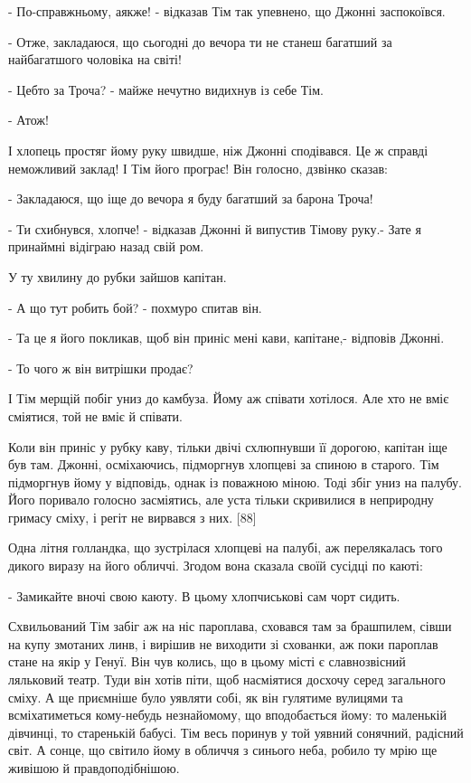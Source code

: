 - По-справжньому, аякже! - відказав Тім так упевнено, що Джонні заспокоївся.

- Отже, закладаюся, що сьогодні до вечора ти не станеш багатший за найбагатшого чоловіка на світі!

- Цебто за Троча? - майже нечутно видихнув із себе Тім.

- Атож!

І хлопець простяг йому руку швидше, ніж Джонні сподівався. Це ж справді неможливий заклад! І Тім його програє! Він голосно, дзвінко сказав:

- Закладаюся, що іще до вечора я буду багатший за барона Троча!

- Ти схибнувся, хлопче! - відказав Джонні й випустив Тімову руку.- Зате я принаймні відіграю назад свій ром.

У ту хвилину до рубки зайшов капітан.

- А що тут робить бой? - похмуро спитав він.

- Та це я його покликав, щоб він приніс мені кави, капітане,- відповів Джонні.

- То чого ж він витрішки продає?

І Тім мерщій побіг униз до камбуза. Йому аж співати хотілося. Але хто не вміє сміятися, той не вміє й співати.

Коли він приніс у рубку каву, тільки двічі схлюпнувши її дорогою, капітан іще був там. Джонні, осміхаючись, підморгнув хлопцеві за спиною в старого. Тім підморгнув йому у відповідь, однак із поважною міною. Тоді збіг униз на палубу. Його поривало голосно засміятись, але уста тільки скривилися в неприродну гримасу сміху, і регіт не вирвався з них. [88]

Одна літня голландка, що зустрілася хлопцеві на палубі, аж перелякалась того дикого виразу на його обличчі. Згодом вона сказала своїй сусідці по каюті:

- Замикайте вночі свою каюту. В цьому хлопчиськові сам чорт сидить.

Схвильований Тім забіг аж на ніс пароплава, сховався там за брашпилем, сівши на купу змотаних линв, і вирішив не виходити зі схованки, аж поки пароплав стане на якір у Генуї. Він чув колись, що в цьому місті є славнозвісний ляльковий театр. Туди він хотів піти, щоб насміятися досхочу серед загального сміху. А ще приємніше було уявляти собі, як він гулятиме вулицями та всміхатиметься кому-небудь незнайомому, що вподобається йому: то маленькій дівчинці, то старенькій бабусі. Тім весь поринув у той уявний сонячний, радісний світ. А сонце, що світило йому в обличчя з синього неба, робило ту мрію ще живішою й правдоподібнішою.

